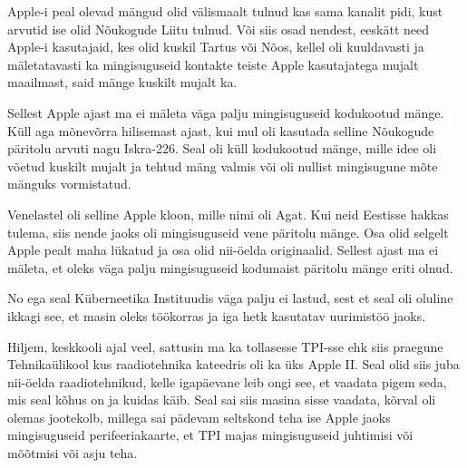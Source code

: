 
Apple-i peal olevad mängud olid välismaalt tulnud kas sama kanalit pidi, kust 
arvutid ise olid Nõukogude Liitu tulnud. Või siis osad nendest, eeskätt need 
Apple-i kasutajaid, kes olid kuskil Tartus või Nõos, kellel oli kuuldavasti ja 
mäletatavasti ka mingisuguseid kontakte teiste Apple kasutajatega mujalt 
maailmast, said mänge kuskilt mujalt ka.


Sellest Apple ajast ma ei mäleta väga palju mingisuguseid kodukootud mänge. 
Küll aga mõnevõrra hilisemast ajast, kui mul oli kasutada selline Nõukogude 
päritolu arvuti nagu 
Iskra-226. Seal oli küll 
kodukootud mänge, mille idee oli võetud kuskilt mujalt ja tehtud mäng valmis  
või oli nullist mingisugune mõte mänguks vormistatud. 

Venelastel oli selline Apple kloon, mille  nimi oli  Agat. 
Kui neid Eestisse hakkas tulema, siis nende jaoks oli mingisuguseid vene 
päritolu mänge. Osa  olid selgelt Apple pealt maha lükatud ja osa olid  
nii-öelda originaalid. Sellest ajast ma ei mäleta, et oleks väga palju 
mingisuguseid kodumaist päritolu mänge eriti olnud.


No ega seal Küberneetika Instituudis väga palju 
ei lastud, sest et seal oli oluline ikkagi see, et masin oleks töökorras ja iga 
hetk kasutatav  uurimistöö jaoks.

Hiljem,  keskkooli ajal veel, sattusin ma ka tollasesse TPI-sse ehk siis 
praegune Tehnikaülikool kus raadiotehnika 
kateedris oli ka üks Apple II.  Seal olid siis juba 
nii-öelda raadiotehnikud, kelle igapäevane leib ongi see,  et vaadata pigem 
seda, mis seal kõhus on ja kuidas käib. Seal sai siis masina sisse vaadata, 
kõrval oli olemas  jootekolb, millega sai pädevam seltskond teha ise Apple 
jaoks mingisuguseid perifeeriakaarte, et TPI majas mingisuguseid juhtimisi või 
mõõtmisi või asju teha.  

